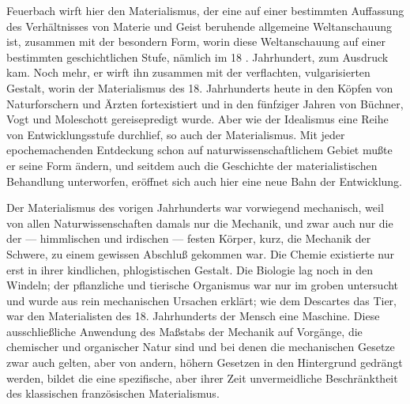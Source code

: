 Feuerbach wirft hier den Materialismus, der eine auf einer
bestimmten Auffassung des Verhältnisses von Materie und Geist beruhende
allgemeine Weltanschauung ist, zusammen mit der besondern Form, worin
diese Weltanschauung auf einer bestimmten geschichtlichen Stufe, \textbar{} nämlich
im 18 \textbar{}. Jahrhundert, zum Ausdruck kam. Noch mehr, er wirft ihn zusammen
mit der verflachten, vulgarisierten Gestalt, worin der Materialismus des
18. Jahrhunderts heute in den Köpfen von Naturforschern und Ärzten
fortexistiert und in den fünfziger Jahren von Büchner, Vogt und
Moleschott gereisepredigt wurde. Aber wie der Idealismus eine Reihe von
Entwicklungsstufe durchlief, so auch der Materialismus. Mit jeder
epochemachenden Entdeckung schon auf naturwissenschaftlichem Gebiet
mußte er seine Form ändern, und seitdem auch die Geschichte der
materialistischen Behandlung unterworfen, eröffnet sich auch hier eine
neue Bahn der Entwicklung.

Der Materialismus des vorigen Jahrhunderts war vorwiegend
mechanisch, weil von allen Naturwissenschaften damals nur die Mechanik,
und zwar auch nur die der --- himmlischen und irdischen --- festen Körper,
kurz, die Mechanik der Schwere, zu einem gewissen Abschluß gekommen war.
Die Chemie existierte nur erst in ihrer kindlichen, phlogistischen
Gestalt. Die Biologie lag noch in den Windeln; der pflanzliche und
tierische Organismus war nur im groben untersucht und wurde aus rein
mechanischen Ursachen erklärt; wie dem Descartes das Tier, war den
Materialisten des 18. Jahrhunderts der Mensch eine Maschine. Diese
ausschließliche Anwendung des Maßstabs der Mechanik auf Vorgänge, die
chemischer und organischer Natur sind und bei denen die mechanischen
Gesetze zwar auch gelten, aber von andern, höhern Gesetzen in den
Hintergrund gedrängt werden, bildet die eine spezifische, aber ihrer
Zeit unvermeidliche Beschränktheit des klassischen französischen
Materialismus.

